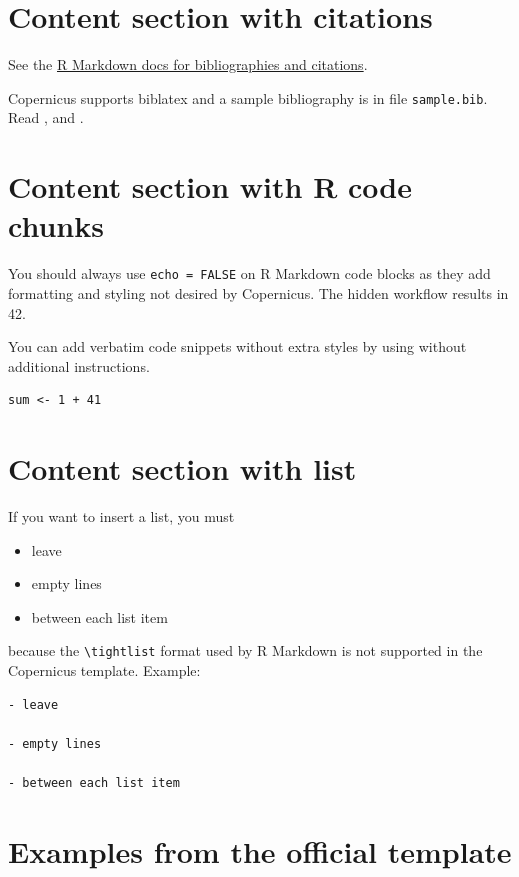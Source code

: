 \documentclass[gmd, manuscript]{copernicus}
\begin{document}
\section{Content section with citations}

See the
\href{http://rmarkdown.rstudio.com/authoring_bibliographies_and_citations.html}{R
Markdown docs for bibliographies and citations}.

Copernicus supports biblatex and a sample bibliography is in file
\texttt{sample.bib}. Read \citep{Feynman1963118}, and
\citep[see][]{Dirac1953888}.

\section{Content section with R code chunks}

You should always use \texttt{echo\ =\ FALSE} on R Markdown code blocks
as they add formatting and styling not desired by Copernicus. The hidden
workflow results in 42.

You can add verbatim code snippets without extra styles by using
\texttt{\textasciigrave{}\textasciigrave{}\textasciigrave{}} without
additional instructions.

\begin{verbatim}
sum <- 1 + 41
\end{verbatim}

\section{Content section with list}

If you want to insert a list, you must

\begin{itemize}
\item
  leave
\item
  empty lines
\item
  between each list item
\end{itemize}

because the \texttt{\textbackslash{}tightlist} format used by R Markdown
is not supported in the Copernicus template. Example:

\begin{verbatim}
- leave

- empty lines

- between each list item
\end{verbatim}

\section{Examples from the official template}
\end{document}
